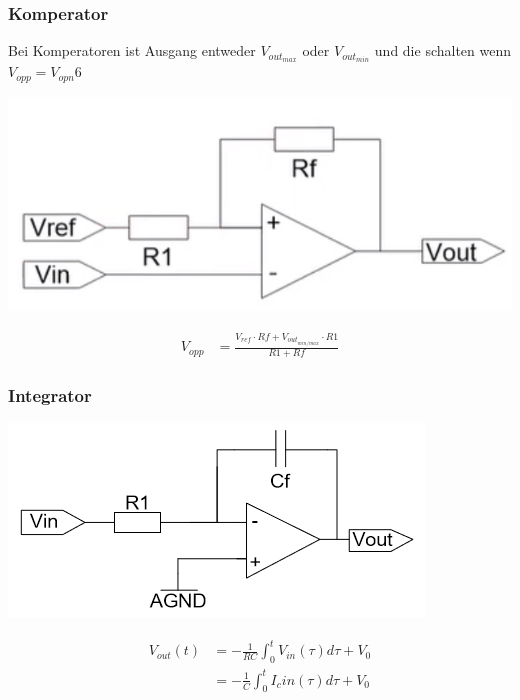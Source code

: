\subsubsection{Komperator}
Bei Komperatoren ist Ausgang entweder $V_{out_{max}}$ oder $V_{out_{min}}$ und die schalten wenn $V_{opp} = V_{opn}$6\\
\begin{minipage}{0.20\textwidth}
	\includegraphics[width=\linewidth,keepaspectratio=true]{./Images/komperator_invertierend}
\end{minipage}%
\begin{minipage}{0.30\textwidth}
	\begin{align*}
		V_{opp} &= \frac{V_{ref}\cdot Rf + V_{out_{min/max}}\cdot R1}{R1 + Rf}
	\end{align*}
\end{minipage}

\subsubsection{Integrator}
\begin{minipage}{0.20\textwidth}
	\includegraphics[width=\linewidth,keepaspectratio=true]{./Images/integrator}
\end{minipage}%
\begin{minipage}{0.30\textwidth}
	\begin{align*}
		V_{out}(t) &= -\frac{1}{RC}\int_{0}^{t}V_{in}(\tau)d\tau + V_0 \\
		&= -\frac{1}{C}\int_{0}^{t}I_c{in}(\tau)d\tau + V_0
	\end{align*}
\end{minipage}

